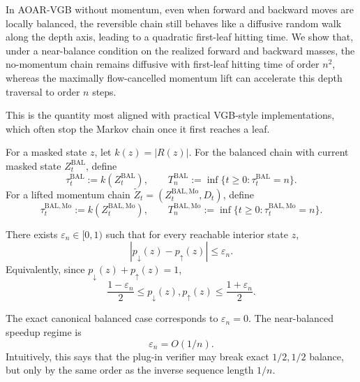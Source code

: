 \documentclass{article}
\numberwithin{theorem}{section}
\numberwithin{proposition}{section}
\numberwithin{corollary}{section}
\numberwithin{lemma}{section}
\numberwithin{conjecture}{section}
\numberwithin{remark}{section}
\numberwithin{definition}{section}
\numberwithin{assumption}{section}
\numberwithin{example}{section}
\newcommand{\abs}[1]{\left| #1\right|}
\begin{document}
In AOAR-VGB without momentum, even when forward and backward moves are locally balanced, the reversible chain still behaves like a diffusive random walk along the depth axis, leading to a quadratic first-leaf hitting time. We show that, under a near-balance condition on the realized forward and backward masses, the no-momentum chain remains diffusive with first-leaf hitting time of order $n^2$, whereas the maximally flow-cancelled momentum lift can accelerate this depth traversal to order $n$ steps.

This is the quantity most aligned with practical VGB-style implementations, which often stop the Markov chain once it first reaches a leaf.

\begin{definition}
\label{def:depth_process}
For a masked state $z$, let $k(z)=|R(z)|$. For the balanced chain with current masked state $Z_t^{\mathrm{BAL}}$, define
\begin{equation*}
    \tau_t^{\mathrm{BAL}}:=k(Z_t^{\mathrm{BAL}}), \qquad
    T_n^{\mathrm{BAL}}:=\inf\{t\ge 0:\tau_t^{\mathrm{BAL}}=n\}.
\end{equation*}
For a lifted momentum chain $\widetilde Z_t=(Z_t^{\mathrm{BAL,Mo}},D_t)$, define
\begin{equation*}
    \tau_t^{\mathrm{BAL,Mo}}:=k(Z_t^{\mathrm{BAL,Mo}}), \qquad
    T_n^{\mathrm{BAL,Mo}}:=\inf\{t\ge 0:\tau_t^{\mathrm{BAL,Mo}}=n\}.
\end{equation*}
\end{definition}

\begin{assumption}
\label{ass:directional_near_balance}
There exists $\varepsilon_n\in[0,1)$ such that for every reachable interior state $z$,
\begin{equation*}
    \abs{p_{\downarrow}(z)-p_{\uparrow}(z)}\le \varepsilon_n.
\end{equation*}
Equivalently, since $p_{\downarrow}(z)+p_{\uparrow}(z)=1$,
\begin{equation*}
    \frac{1-\varepsilon_n}{2}\le p_{\downarrow}(z),p_{\uparrow}(z)\le \frac{1+\varepsilon_n}{2}.
\end{equation*}
\end{assumption}

The exact canonical balanced case corresponds to $\varepsilon_n=0$. The near-balanced speedup regime is
\begin{equation*}
    \varepsilon_n=O(1/n).
\end{equation*}
Intuitively, this says that the plug-in verifier may break exact $1/2,1/2$ balance, but only by the same order as the inverse sequence length $1/n$.
\end{document}
